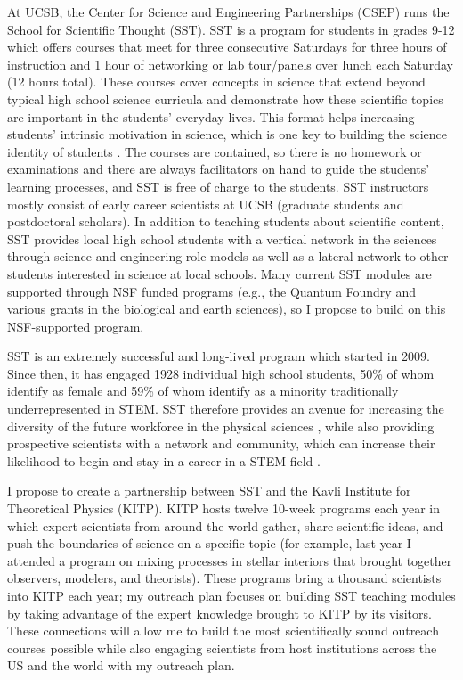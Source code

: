 \documentclass[11pt]{amsart} %
\theoremstyle{definition}
\numberwithin{equation}{section}
\begin{document}
At UCSB, the Center for Science and Engineering Partnerships (CSEP) runs the School for Scientific Thought (SST).
SST is a program for students in grades 9-12 which offers courses that meet for three consecutive Saturdays for three hours of instruction and 1 hour of networking or lab tour/panels over lunch each Saturday (12 hours total).
These courses cover concepts in science that extend beyond typical high school science curricula and demonstrate how these scientific topics are important in the students' everyday lives.
This format helps increasing students' intrinsic motivation in science, which is one key to building the science identity of students \citep{kelly_2016}.
The courses are contained, so there is no homework or examinations and there are always facilitators on hand to guide the students' learning processes, and SST is free of charge to the students.
SST instructors mostly consist of early career scientists at UCSB (graduate students and postdoctoral scholars).
In addition to teaching students about scientific content, SST provides local high school students with a vertical network in the sciences through science and engineering role models as well as a lateral network to other students interested in science at local schools.
Many current SST modules are supported through NSF funded programs (e.g., the Quantum Foundry and various grants in the biological and earth sciences), so I propose to build on this NSF-supported program.

SST is an extremely successful and long-lived program which started in 2009.
Since then, it has engaged 1928 individual high school students, 50\% of whom identify as female and 59\% of whom identify as a minority traditionally underrepresented in STEM.
SST therefore provides an avenue for increasing the diversity of the future workforce in the physical sciences \citep{stem_laborforce_2021}, while also providing prospective scientists with a network and community, which can increase their likelihood to begin and stay in a career in a STEM field \citep{saw_2020}.

I propose to create a partnership between SST and the Kavli Institute for Theoretical Physics (KITP).
KITP hosts twelve 10-week programs each year in which expert scientists from around the world gather, share scientific ideas, and push the boundaries of science on a specific topic (for example, last year I attended a program on mixing processes in stellar interiors that brought together observers, modelers, and theorists).
These programs bring a thousand scientists into KITP each year; my outreach plan focuses on building SST teaching modules by taking advantage of the expert knowledge brought to KITP by its visitors.
These connections will allow me to build the most scientifically sound outreach courses possible while also engaging scientists from host institutions across the US and the world with my outreach plan.
\end{document}
